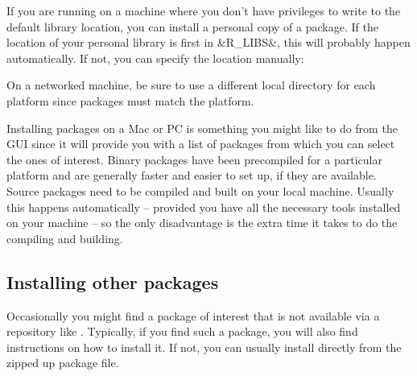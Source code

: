 If you are running on a machine where you don't have privileges to
write to the default library location, you can install a personal 
copy of a package.  If the location of your personal library is 
first in &R_LIBS&, this will probably happen automatically.  If not,
you can specify the location manually:

\begin{knitrout}
\end{knitrout}

On a networked machine, be sure to use a different local directory for 
each platform since packages must match the platform.

Installing  packages on a Mac or PC is something you might like to do 
from the GUI since it will provide you with a list of packages from 
which you can select the ones of interest.
Binary packages have been precompiled for a 
particular platform and are generally faster and easier to set up, if they 
are available.  Source packages need to be compiled and built on your local
machine.  Usually this happens automatically -- provided you have all the 
necessary tools installed on your machine -- so the only disadvantage is the
extra time it takes to do the compiling and building.

\subsection{Installing other packages}

Occasionally you might find a package of interest that is not available via
a repository like \cran.  
Typically, if you find such a package, you will also find instructions
on how to install it.  If not, you can usually install directly from the 
zipped up package file.

\begin{knitrout}
\end{knitrout}





